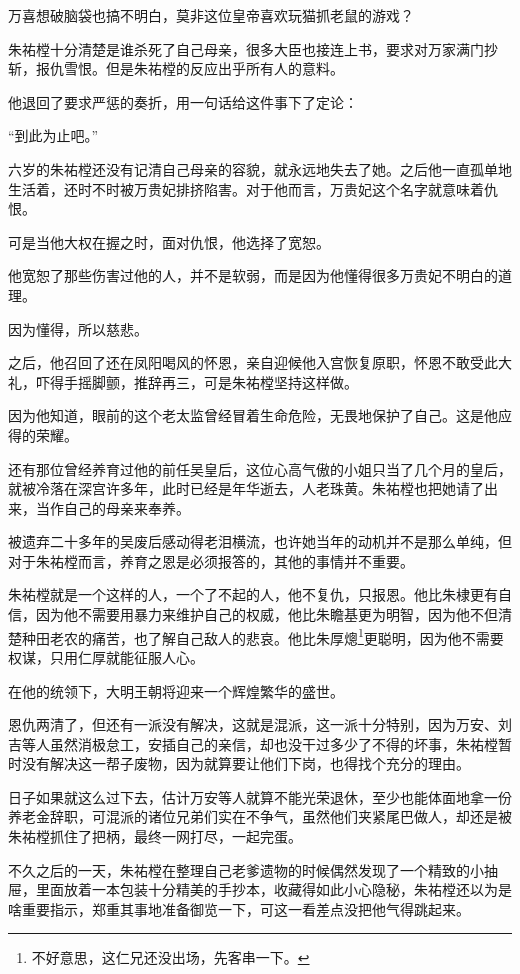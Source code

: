 \begin{multicols}{\theparacolNo}
万喜想破脑袋也搞不明白，莫非这位皇帝喜欢玩猫抓老鼠的游戏？

朱祐樘十分清楚是谁杀死了自己母亲，很多大臣也接连上书，要求对万家满门抄斩，报仇雪恨。但是朱祐樘的反应出乎所有人的意料。

他退回了要求严惩的奏折，用一句话给这件事下了定论：

“到此为止吧。”

六岁的朱祐樘还没有记清自己母亲的容貌，就永远地失去了她。之后他一直孤单地生活着，还时不时被万贵妃排挤陷害。对于他而言，万贵妃这个名字就意味着仇恨。

可是当他大权在握之时，面对仇恨，他选择了宽恕。

他宽恕了那些伤害过他的人，并不是软弱，而是因为他懂得很多万贵妃不明白的道理。

因为懂得，所以慈悲。

之后，他召回了还在凤阳喝风的怀恩，亲自迎候他入宫恢复原职，怀恩不敢受此大礼，吓得手摇脚颤，推辞再三，可是朱祐樘坚持这样做。

因为他知道，眼前的这个老太监曾经冒着生命危险，无畏地保护了自己。这是他应得的荣耀。

还有那位曾经养育过他的前任吴皇后，这位心高气傲的小姐只当了几个月的皇后，就被冷落在深宫许多年，此时已经是年华逝去，人老珠黄。朱祐樘也把她请了出来，当作自己的母亲来奉养。

被遗弃二十多年的吴废后感动得老泪横流，也许她当年的动机并不是那么单纯，但对于朱祐樘而言，养育之恩是必须报答的，其他的事情并不重要。

朱祐樘就是一个这样的人，一个了不起的人，他不复仇，只报恩。他比朱棣更有自信，因为他不需要用暴力来维护自己的权威，他比朱瞻基更为明智，因为他不但清楚种田老农的痛苦，也了解自己敌人的悲哀。他比朱厚熜\footnote{不好意思，这仁兄还没出场，先客串一下。}更聪明，因为他不需要权谋，只用仁厚就能征服人心。

在他的统领下，大明王朝将迎来一个辉煌繁华的盛世。

恩仇两清了，但还有一派没有解决，这就是混派，这一派十分特别，因为万安、刘吉等人虽然消极怠工，安插自己的亲信，却也没干过多少了不得的坏事，朱祐樘暂时没有解决这一帮子废物，因为就算要让他们下岗，也得找个充分的理由。

日子如果就这么过下去，估计万安等人就算不能光荣退休，至少也能体面地拿一份养老金辞职，可混派的诸位兄弟们实在不争气，虽然他们夹紧尾巴做人，却还是被朱祐樘抓住了把柄，最终一网打尽，一起完蛋。

不久之后的一天，朱祐樘在整理自己老爹遗物的时候偶然发现了一个精致的小抽屉，里面放着一本包装十分精美的手抄本，收藏得如此小心隐秘，朱祐樘还以为是啥重要指示，郑重其事地准备御览一下，可这一看差点没把他气得跳起来。


\end{multicols}
